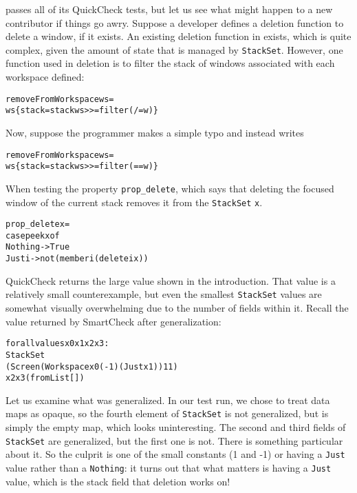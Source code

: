 \documentclass{sigplanconf}
\newenvironment{code}{\begin{alltt}\footnotesize}{\end{alltt}}
\newcommand{\ttp}[1]{\texttt{#1}}
\begin{document}
\xmonad passes all of its QuickCheck tests, but let us see what might happen to
a new contributor if things go awry.  Suppose a developer defines a deletion
function to delete a window, if it exists.  An existing deletion function in
\xmonad exists, which is quite complex, given the amount of state that is
managed by \ttp{StackSet}.  However, one function used in deletion is to filter
the stack of windows associated with each workspace defined:
%
\begin{code}
removeFromWorkspace ws =
  ws \{ stack = stack ws >>= filter (/= w) \}
\end{code}
%
\noindent
Now, suppose the programmer makes a simple typo and instead writes
%
\begin{code}
removeFromWorkspace ws =
  ws \{ stack = stack ws >>= filter (== w) \}
\end{code}
%
\noindent
When testing the property \ttp{prop\_delete}, which says that deleting the
focused window of the current stack removes it from the \ttp{StackSet} \ttp{x}.
%
\begin{code}
prop_delete x =
    case peek x of
        Nothing -> True
        Just i  -> not (member i (delete i x))
\end{code}
%
\noindent
QuickCheck returns the large value shown in the introduction.  That value is a
relatively small counterexample, but even the smallest \ttp{StackSet} values are
somewhat visually overwhelming due to the number of fields within it.  Recall
the value returned by SmartCheck after generalization:
%
\begin{code}
forall values x0 x1 x2 x3:
  StackSet
    (Screen (Workspace x0 (-1) (Just x1)) 1 1)
    x2 x3 (fromList [])
\end{code}
%
\noindent
Let us examine what was generalized.  In our test run, we chose to treat data
maps as opaque, so the fourth element of \ttp{StackSet} is not generalized, but
is simply the empty map, which looks uninteresting.  The second and third fields of
\ttp{StackSet} are generalized, but the first one is not.  There is something
particular about it.  So the culprit is one of the small constants (1 and -1) or
having a \ttp{Just} value rather than a \ttp{Nothing}: it turns out that what
matters is having a \ttp{Just} value, which is the stack field that deletion
works on!


\end{document}
